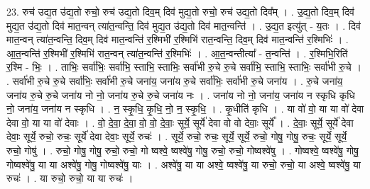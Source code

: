 \documentclass[17pt]{extarticle}
\begin{document}
23. रुच॑ उद्य॒त उ॑द्य॒तो रुचो॒ रुच॑ उद्य॒तो दिव॒म् दिव॑ मुद्य॒तो रुचो॒ रुच॑ उद्य॒तो दिव᳚म् । . उ॒द्य॒तो दिव॒म् दिव॑ मुद्य॒त उ॑द्य॒तो दिव॑ मात॒न्वन् त्या॑त॒न्वन्ति॒ दिव॑ मुद्य॒त उ॑द्य॒तो दिव॑ मात॒न्वन्ति॑ । . उ॒द्य॒त इत्यु॑त् - य॒तः । . दिव॑ मात॒न्वन् त्या॑त॒न्वन्ति॒ दिव॒म् दिव॑ मात॒न्वन्ति॑ र॒श्मिभी॑ र॒श्मिभि॑ रात॒न्वन्ति॒ दिव॒म् दिव॑ मात॒न्वन्ति॑ र॒श्मिभिः॑ । . आ॒त॒न्वन्ति॑ र॒श्मिभी॑ र॒श्मिभि॑ रात॒न्वन् त्या॑त॒न्वन्ति॑ र॒श्मिभिः॑ । . आ॒त॒न्वन्तीत्या᳚ - त॒न्वन्ति॑ । . र॒श्मिभि॒रिति॑ र॒श्मि - भिः॒ । . ताभिः॒ सर्वा॑भिः॒ सर्वा॑भि॒ स्ताभि॒ स्ताभिः॒ सर्वा॑भी रु॒चे रु॒चे सर्वा॑भि॒ स्ताभि॒ स्ताभिः॒ सर्वा॑भी रु॒चे । . सर्वा॑भी रु॒चे रु॒चे सर्वा॑भिः॒ सर्वा॑भी रु॒चे जना॑य॒ जना॑य रु॒चे सर्वा॑भिः॒ सर्वा॑भी रु॒चे जना॑य । . रु॒चे जना॑य॒ जना॑य रु॒चे रु॒चे जना॑य नो नो॒ जना॑य रु॒चे रु॒चे जना॑य नः । . जना॑य नो नो॒ जना॑य॒ जना॑य न स्कृधि कृधि नो॒ जना॑य॒ जना॑य न स्कृधि । . न॒ स्कृ॒धि॒ कृ॒धि॒ नो॒ न॒ स्कृ॒धि॒ । . कृ॒धीति॑ कृधि । . या वो॑ वो॒ या या वो॑ देवा देवा वो॒ या या वो॑ देवाः । . वो॒ दे॒वा॒ दे॒वा॒ वो॒ वो॒ दे॒वाः॒ सूर्ये॒ सूर्ये॑ देवा वो वो देवाः॒ सूर्ये᳚ । . दे॒वाः॒ सूर्ये॒ सूर्ये॑ देवा देवाः॒ सूर्ये॒ रुचो॒ रुचः॒ सूर्ये॑ देवा देवाः॒ सूर्ये॒ रुचः॑ । . सूर्ये॒ रुचो॒ रुचः॒ सूर्ये॒ सूर्ये॒ रुचो॒ गोषु॒ गोषु॒ रुचः॒ सूर्ये॒ सूर्ये॒ रुचो॒ गोषु॑ । . रुचो॒ गोषु॒ गोषु॒ रुचो॒ रुचो॒ गो ष्वश्वे॒ ष्वश्वे॑षु॒ गोषु॒ रुचो॒ रुचो॒ गोष्वश्वे॑षु । . गोष्वश्वे॒ ष्वश्वे॑षु॒ गोषु॒ गोष्वश्वे॑षु॒ या या अश्वे॑षु॒ गोषु॒ गोष्वश्वे॑षु॒ याः । . अश्वे॑षु॒ या या अश्वे॒ ष्वश्वे॑षु॒ या रुचो॒ रुचो॒ या अश्वे॒ ष्वश्वे॑षु॒ या रुचः॑ । . या रुचो॒ रुचो॒ या या रुचः॑ । \newline
\end{document}

